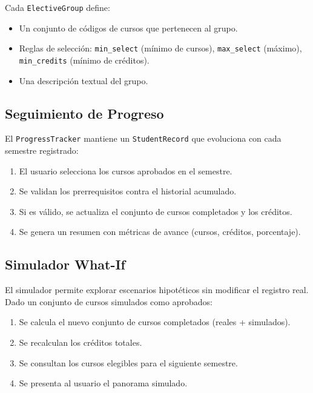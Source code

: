 \documentclass[12pt]{report}
\begin{document}
Cada \texttt{ElectiveGroup} define:
\begin{itemize}
    \item Un conjunto de códigos de cursos que pertenecen al grupo.
    \item Reglas de selección: \texttt{min\_select} (mínimo de cursos), \texttt{max\_select} (máximo), \texttt{min\_credits} (mínimo de créditos).
    \item Una descripción textual del grupo.
\end{itemize}

\subsection{Seguimiento de Progreso}

El \texttt{ProgressTracker} mantiene un \texttt{StudentRecord} que evoluciona con cada semestre registrado:

\begin{enumerate}
    \item El usuario selecciona los cursos aprobados en el semestre.
    \item Se validan los prerrequisitos contra el historial acumulado.
    \item Si es válido, se actualiza el conjunto de cursos completados y los créditos.
    \item Se genera un resumen con métricas de avance (cursos, créditos, porcentaje).
\end{enumerate}

\subsection{Simulador What-If}

El simulador permite explorar escenarios hipotéticos sin modificar el registro real. Dado un conjunto de cursos simulados como aprobados:
\begin{enumerate}
    \item Se calcula el nuevo conjunto de cursos completados (reales + simulados).
    \item Se recalculan los créditos totales.
    \item Se consultan los cursos elegibles para el siguiente semestre.
    \item Se presenta al usuario el panorama simulado.
\end{enumerate}

\end{document}
